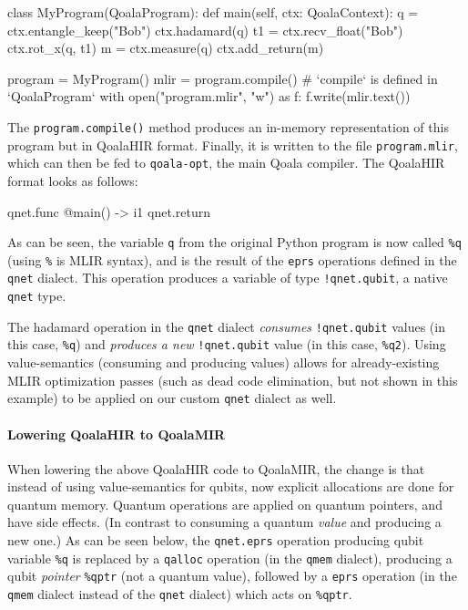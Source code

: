 \begin{pycode}
class MyProgram(QoalaProgram):
    def main(self, ctx: QoalaContext):
        q = ctx.entangle_keep("Bob")
        ctx.hadamard(q)
        t1 = ctx.recv_float("Bob")
        ctx.rot_x(q, t1)
        m = ctx.measure(q)
        ctx.add_return(m)

program = MyProgram()
mlir = program.compile()  # `compile` is defined in `QoalaProgram`
with open("program.mlir", "w") as f:
    f.write(mlir.text())
\end{pycode}

The \texttt{program.compile()} method produces an in-memory representation of this program but in QoalaHIR format.
Finally, it is written to the file \texttt{program.mlir}, which can then be fed to \texttt{qoala-opt}, the main Qoala compiler.
The QoalaHIR format looks as follows:

\begin{pycode}
qnet.func @main() -> i1 {
    qnet.return %
}
\end{pycode}

As can be seen, the variable \texttt{q} from the original Python program is now called \texttt{\%q} (using \texttt{\%} is MLIR syntax), and is the result of the \texttt{eprs} operations defined in the \texttt{qnet} dialect.
This operation produces a variable of type \texttt{!qnet.qubit}, a native \texttt{qnet} type.

The hadamard operation in the \texttt{qnet} dialect \emph{consumes} \texttt{!qnet.qubit} values (in this case, \texttt{\%q}) and \emph{produces a new} \texttt{!qnet.qubit} value (in this case, \texttt{\%q2}).
Using value-semantics (consuming and producing values) allows for already-existing MLIR optimization passes (such as dead code elimination, but not shown in this example) to be applied on our custom \texttt{qnet} dialect as well.

\paragraph{Lowering QoalaHIR to QoalaMIR}

When lowering the above QoalaHIR code to QoalaMIR, the change is that instead of using value-semantics for qubits, now explicit allocations are done for quantum memory.
Quantum operations are applied on quantum pointers, and have side effects.
(In contrast to consuming a quantum \emph{value} and producing a new one.)
As can be seen below, the \texttt{qnet.eprs} operation producing qubit variable \texttt{\%q} is replaced by a \texttt{qalloc} operation (in the \texttt{qmem} dialect), producing a qubit \emph{pointer} \texttt{\%qptr} (not a quantum value), followed by a \texttt{eprs} operation (in the \texttt{qmem} dialect instead of the \texttt{qnet} dialect) which acts on \texttt{\%qptr}.
\newpage

